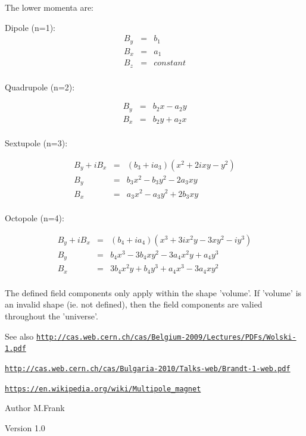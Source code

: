 The lower momenta are:

\begin{DoxyItemize}
\item Dipole (n=1): \begin{eqnarray*} B_y &=& b_1 \\ B_x &=& a_1 \\ B_z &=& constant \\ \end{eqnarray*}\end{DoxyItemize}
\begin{DoxyItemize}
\item Quadrupole (n=2):\end{DoxyItemize}
\begin{eqnarray*} B_y &=& b_2 x - a_2 y \\ B_x &=& b_2 y + a_2 x \\ \end{eqnarray*}

\begin{DoxyItemize}
\item Sextupole (n=3):\end{DoxyItemize}
\begin{eqnarray*} B_y + i B_x &=& (b_3 +ia_3) (x^2 + 2ixy - y^2) \\ B_y &=& b_3 x^2 - b_3 y^2 - 2 a_3 xy \\ B_x &=& a_3 x^2 - a_3 y^2 + 2 b_3 xy \\ \end{eqnarray*}

\begin{DoxyItemize}
\item Octopole (n=4):\end{DoxyItemize}
\begin{eqnarray*} B_y + i B_x &=& (b_4 +ia_4) (x^3 + 3ix^2y - 3xy^2 -iy^3) \\ B_y &=& b_4 x^3 - 3 b_4 x y^2 - 3 a_4 x^2 y + a_4 y^3 \\ B_x &=& 3 b_4 x^2 y + b_4 y^3 + a_4 x^3 - 3 a_4 x y^2 \\ \end{eqnarray*}

The defined field components only apply within the shape 'volume'. If 'volume' is an invalid shape (ie. not defined), then the field components are valied throughout the 'universe'.

\begin{DoxySeeAlso}{See also}
\href{http://cas.web.cern.ch/cas/Belgium-2009/Lectures/PDFs/Wolski-1.pdf}{\tt http://cas.web.cern.ch/cas/Belgium-\/2009/Lectures/PDFs/Wolski-\/1.pdf} 

\href{http://cas.web.cern.ch/cas/Bulgaria-2010/Talks-web/Brandt-1-web.pdf}{\tt http://cas.web.cern.ch/cas/Bulgaria-\/2010/Talks-\/web/Brandt-\/1-\/web.pdf} 

\href{https://en.wikipedia.org/wiki/Multipole_magnet}{\tt https://en.wikipedia.org/wiki/Multipole\_\-magnet}
\end{DoxySeeAlso}
\begin{DoxyAuthor}{Author}
M.Frank 
\end{DoxyAuthor}
\begin{DoxyVersion}{Version}
1.0 
\end{DoxyVersion}



